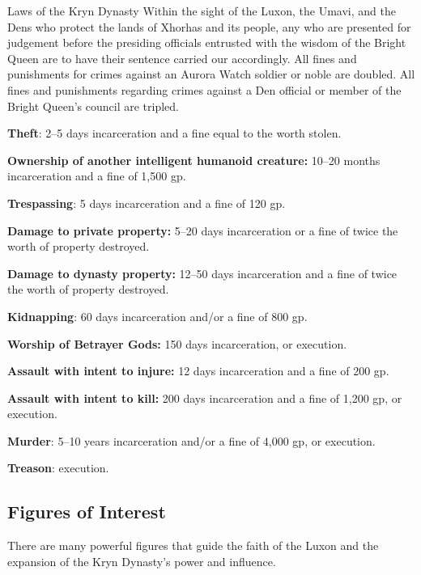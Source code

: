 \documentclass[10pt,a4paper,twoside,bg=print,twocolumn,openany,nodeprecatedcode]{dndbook}
\begin{document}
\begin{DndSidebar}[float=!b]{Laws of the Kryn Dynasty}
Within the sight of the Luxon, the Umavi, and the Dens who protect the lands of Xhorhas and its people, any who are presented for judgement before the presiding officials entrusted with the wisdom of the Bright Queen are to have their sentence carried our accordingly. All fines and punishments for crimes against an Aurora Watch soldier or noble are doubled. All fines and punishments regarding crimes against a Den official or member of the Bright Queen's council are tripled.



\textbf{Theft}: 2–5 days incarceration and a fine equal to the worth stolen.



\textbf{Ownership of another intelligent humanoid creature:} 10–20 months incarceration and a fine of 1,500 gp.



\textbf{Trespassing}: 5 days incarceration and a fine of 120 gp.



\textbf{Damage to private property:} 5–20 days incarceration or a fine of twice the worth of property destroyed.



\textbf{Damage to dynasty property:} 12–50 days incarceration and a fine of twice the worth of property destroyed.



\textbf{Kidnapping}: 60 days incarceration and/or a fine of 800 gp.



\textbf{Worship of Betrayer Gods:} 150 days incarceration, or execution.



\textbf{Assault with intent to injure:} 12 days incarceration and a fine of 200 gp.



\textbf{Assault with intent to kill:} 200 days incarceration and a fine of 1,200 gp, or execution.



\textbf{Murder}: 5–10 years incarceration and/or a fine of 4,000 gp, or execution.



\textbf{Treason}: execution.



\end{DndSidebar}

\subsection{Figures of Interest}
There are many powerful figures that guide the faith of the Luxon and the expansion of the Kryn Dynasty's power and influence.
\end{document}
